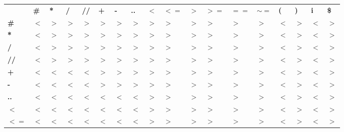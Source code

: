 \documentclass[a4paper, 11pt]{article}
\begin{document}
    \begin{center}
        \begin{adjustwidth}{-0.4cm}{}
            \begin{tabular}{!{\vrule width 2pt} >{}P{5.5mm} !{\vrule width 2pt} P{5.5mm} | P{5.5mm} | P{5.5mm} | P{5.5mm} | P{5.5mm} | P{5.5mm} | P{5.5mm} | P{5.5mm} | P{5.5mm} | P{5.5mm} | P{5.5mm} | P{5.5mm} | P{5.5mm} | P{5.5mm} | P{5.5mm} | P{5.5mm} | P{5.5mm} !{\vrule width 2pt}}
                \Xhline{5\arrayrulewidth}
                & \textbf{\#} & \textbf{*} & \textbf{/} & \textbf{//} & \textbf{+} & \textbf{-} & \textbf{..} & $\bm{<}$ & $\bm{<=}$ & $\bm{>}$ & $\bm{>=}$ & $\bm{==}$ & $\bm{\sim=}$ & \textbf{(} & \textbf{)} & \textbf{i} & \textbf{\$} \\ [0.6ex]
                \Xhline{5\arrayrulewidth}
                \textbf{\#}      & $<$ & $>$ & $>$ & $>$ & $>$ & $>$ & $>$ & $>$ & $>$ & $>$ & $>$ & $>$ & $>$ & $<$ & $>$ & $<$ & $>$ \\ [0.5ex]
                \hline
                \textbf{*}       & $<$ & $>$ & $>$ & $>$ & $>$ & $>$ & $>$ & $>$ & $>$ & $>$ & $>$ & $>$ & $>$ & $<$ & $>$ & $<$ & $>$ \\ [0.5ex]
                \hline
                \textbf{/}       & $<$ & $>$ & $>$ & $>$ & $>$ & $>$ & $>$ & $>$ & $>$ & $>$ & $>$ & $>$ & $>$ & $<$ & $>$ & $<$ & $>$ \\ [0.5ex]
                \hline
                \textbf{//}      & $<$ & $>$ & $>$ & $>$ & $>$ & $>$ & $>$ & $>$ & $>$ & $>$ & $>$ & $>$ & $>$ & $<$ & $>$ & $<$ & $>$ \\ [0.5ex]
                \hline
                \textbf{+}       & $<$ & $<$ & $<$ & $<$ & $>$ & $>$ & $>$ & $>$ & $>$ & $>$ & $>$ & $>$ & $>$ & $<$ & $>$ & $<$ & $>$ \\ [0.5ex]
                \hline
                \textbf{-}       & $<$ & $<$ & $<$ & $<$ & $>$ & $>$ & $>$ & $>$ & $>$ & $>$ & $>$ & $>$ & $>$ & $<$ & $>$ & $<$ & $>$ \\ [0.5ex]
                \hline
                \textbf{..}      & $<$ & $<$ & $<$ & $<$ & $<$ & $<$ & $<$ & $>$ & $>$ & $>$ & $>$ & $>$ & $>$ & $<$ & $>$ & $<$ & $>$ \\ [0.5ex]
                \hline
                $\bm{<}$     & $<$ & $<$ & $<$ & $<$ & $<$ & $<$ & $<$ & $>$ & $>$ & $>$ & $>$ & $>$ & $>$ & $<$ & $>$ & $<$ & $>$ \\ [0.5ex]
                \hline
                $\bm{<=}$    & $<$ & $<$ & $<$ & $<$ & $<$ & $<$ & $<$ & $>$ & $>$ & $>$ & $>$ & $>$ & $>$ & $<$ & $>$ & $<$ & $>$ \\ [0.5ex]

\end{tabular}
\end{adjustwidth}
\end{center}
\end{document}
